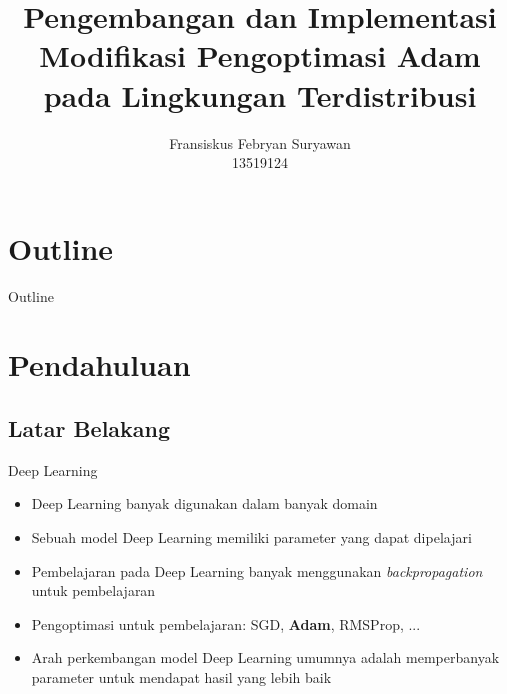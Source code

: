 \documentclass[aspectratio=169]{beamer}
\title[Modifikasi Adam]{Pengembangan dan Implementasi Modifikasi Pengoptimasi Adam pada Lingkungan Terdistribusi}
\author[]{
  Fransiskus Febryan Suryawan\\
  13519124
}
\institute{Institut Teknologi Bandung}
\date{}
\begin{document}
{
\makeatletter
\setlength{\hoffset}{-.5\beamer@sidebarwidth}
\setlength{\voffset}{-.2em}
\makeatother
\begin{frame}[plain]
  \titlepage
\end{frame}
}

\section*{Outline}
\begin{frame}{Outline}
  \begin{center}
    \tableofcontents
  \end{center}
\end{frame}

\section{Pendahuluan}
\subsection{Latar Belakang}
\begin{frame}{Deep Learning}
  \begin{center}
    
  \end{center}
  \begin{itemize}
    \item Deep Learning banyak digunakan dalam banyak domain
    \item Sebuah model Deep Learning memiliki parameter yang dapat dipelajari
    \item Pembelajaran pada Deep Learning banyak menggunakan \textit{backpropagation} untuk pembelajaran
    \item Pengoptimasi untuk pembelajaran: SGD, \textbf{Adam}, RMSProp, ...
    \item Arah perkembangan model Deep Learning umumnya adalah memperbanyak parameter untuk mendapat hasil yang lebih baik
  \end{itemize}
\end{frame}
\end{document}
